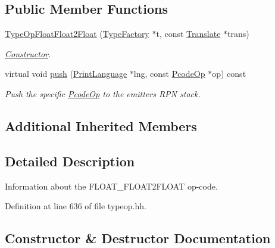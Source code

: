 \subsection*{Public Member Functions}
\begin{DoxyCompactItemize}
\item 
\mbox{\hyperlink{class_type_op_float_float2_float_a7d8af55b0947592f813fedd30e86ab91}{Type\+Op\+Float\+Float2\+Float}} (\mbox{\hyperlink{class_type_factory}{Type\+Factory}} $\ast$t, const \mbox{\hyperlink{class_translate}{Translate}} $\ast$trans)
\begin{DoxyCompactList}\small\item\em \mbox{\hyperlink{class_constructor}{Constructor}}. \end{DoxyCompactList}\item 
virtual void \mbox{\hyperlink{class_type_op_float_float2_float_a811e99c5160578b92050d6bc8900ed8a}{push}} (\mbox{\hyperlink{class_print_language}{Print\+Language}} $\ast$lng, const \mbox{\hyperlink{class_pcode_op}{Pcode\+Op}} $\ast$op) const
\begin{DoxyCompactList}\small\item\em Push the specific \mbox{\hyperlink{class_pcode_op}{Pcode\+Op}} to the emitter\textquotesingle{}s R\+PN stack. \end{DoxyCompactList}\end{DoxyCompactItemize}
\subsection*{Additional Inherited Members}


\subsection{Detailed Description}
Information about the F\+L\+O\+A\+T\+\_\+\+F\+L\+O\+A\+T2\+F\+L\+O\+AT op-\/code. 

Definition at line 636 of file typeop.\+hh.



\subsection{Constructor \& Destructor Documentation}
\mbox{\label{class_type_op_float_float2_float_a7d8af55b0947592f813fedd30e86ab91}} 
